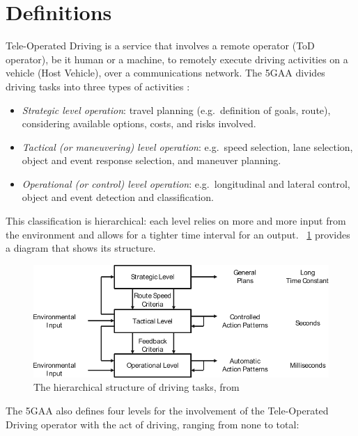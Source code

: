 \section{Definitions}
Tele-Operated Driving is a service that involves a remote operator (ToD operator), be it human or a machine, to remotely execute driving activities on a vehicle (Host Vehicle), over a communications network.
The 5GAA divides driving tasks into three types of activities \cite{5gaa_tod_use_cases_and_requirements}:
\begin{itemize}
    \item \textit{Strategic level operation}: travel planning (e.g.\ definition of goals, route), considering available options, costs, and risks involved.
    \item \textit{Tactical (or maneuvering) level operation}: e.g.\ speed selection, lane selection, object and event response
selection, and maneuver planning. 
    \item \textit{Operational (or control) level operation}: e.g.\ longitudinal and lateral control, object and event detection and classification.
\end{itemize}

This classification is hierarchical: each level relies on more and more input from the environment and allows for a tighter time interval for an output. \figurename~\ref{fig:5gaa_tod_use_cases_and_requirements} provides a diagram that shows its structure. 

\begin{figure}[H]
    \centering
    \includegraphics[width=\textwidth]{images/tele_operated_driving/5gaa_tod_use_cases_and_requirements_fig1.pdf}
    \caption{The hierarchical structure of driving tasks, from \cite{5gaa_tod_use_cases_and_requirements}}
    \label{fig:5gaa_tod_use_cases_and_requirements}
\end{figure}

The 5GAA also defines four levels for the involvement of the Tele-Operated Driving operator with the act of driving, ranging from none to total:

